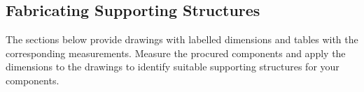 \subsection{Fabricating Supporting Structures}
The sections below provide drawings with labelled dimensions and tables with the corresponding measurements. Measure the procured components and apply the dimensions to the drawings to identify suitable supporting structures for your components.






